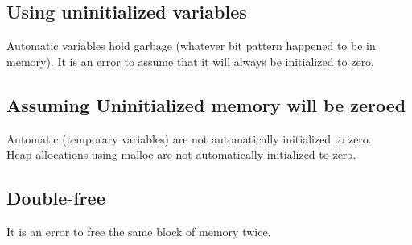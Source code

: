 \subsection{Using uninitialized
variables}\label{using-uninitialized-variables}

\begin{Shaded}
\begin{Highlighting}[]
 
   
   \NormalTok{;}
\end{Highlighting}
\end{Shaded}

Automatic variables hold garbage (whatever bit pattern happened to be in
memory). It is an error to assume that it will always be initialized to
zero.

\subsection{Assuming Uninitialized memory will be
zeroed}\label{assuming-uninitialized-memory-will-be-zeroed}

\begin{Shaded}
\begin{Highlighting}[]
 
    \NormalTok{array[}\NormalTok{];}
    \NormalTok{);}
\end{Highlighting}
\end{Shaded}

Automatic (temporary variables) are not automatically initialized to
zero.\\Heap allocations using malloc are not automatically initialized
to zero.

\subsection{Double-free}\label{double-free}

\begin{Shaded}
\begin{Highlighting}[]
   \NormalTok{);}
\end{Highlighting}
\end{Shaded}

It is an error to free the same block of memory twice.


